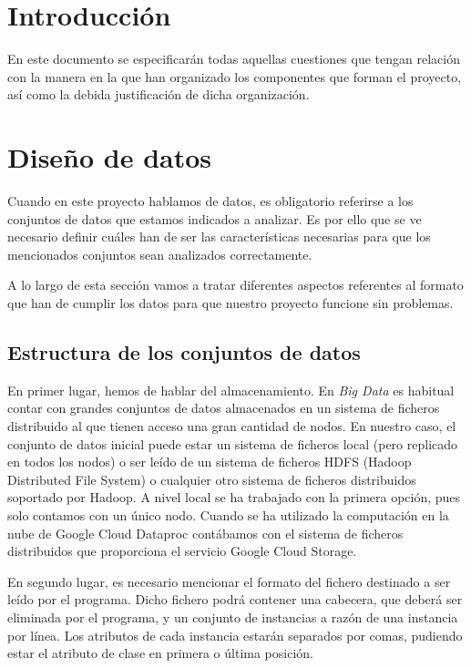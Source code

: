 
\section{Introducción}

En este documento se especificarán todas aquellas cuestiones que tengan relación con la manera en la que han organizado los componentes que forman el proyecto, así como la debida justificación de dicha organización.

\section{Diseño de datos}

Cuando en este proyecto hablamos de datos, es obligatorio referirse a los conjuntos de datos que estamos indicados a analizar. Es por ello que se ve necesario definir cuáles han de ser las características necesarias para que los mencionados conjuntos sean analizados correctamente.

A lo largo de esta sección vamos a tratar diferentes aspectos referentes al formato que han de cumplir los datos para que nuestro proyecto funcione sin problemas.

\subsection{Estructura de los conjuntos de datos}

En primer lugar, hemos de hablar del almacenamiento. En \textit{Big Data} es habitual contar con grandes conjuntos de datos almacenados en un sistema de ficheros distribuido al que tienen acceso una gran cantidad de nodos. En nuestro caso, el conjunto de datos inicial puede estar un  sistema de ficheros local (pero replicado en todos los nodos) o ser leído de un sistema de ficheros HDFS (Hadoop Distributed File System) o cualquier otro sistema de ficheros distribuidos soportado por Hadoop. A nivel local se ha trabajado con la primera opción, pues solo contamos con un único nodo. Cuando se ha utilizado la computación en la nube de Google Cloud Dataproc contábamos con el sistema de ficheros distribuidos que proporciona el servicio Google Cloud Storage.

En segundo lugar, es necesario mencionar el formato del fichero destinado a ser leído por el programa. Dicho fichero podrá contener una cabecera, que deberá ser eliminada por el programa, y un conjunto de instancias a razón de una instancia por línea. Los atributos de cada instancia estarán separados por comas, pudiendo estar el atributo de clase en primera o última posición.


